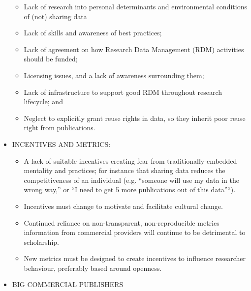 \documentclass[]{article}
\begin{document}
\begin{itemize}
  \begin{itemize}
  \item
    Lack of research into personal determinants and environmental
    conditions of (not) sharing data
  \item
    Lack of skills and awareness of best practices;
  \item
    Lack of agreement on how Research Data Management (RDM) activities
    should be funded;
  \item
    Licensing issues, and a lack of awareness surrounding them;
  \item
    Lack of infrastructure to support good RDM throughout research
    lifecycle; and
  \item
    Neglect to explicitly grant reuse rights in data, so they inherit
    poor reuse right from publications.
  \end{itemize}
\item
  INCENTIVES AND METRICS:

  \begin{itemize}
  \item
    A lack of suitable incentives creating fear from
    traditionally-embedded mentality and practices; for instance that
    sharing data reduces the competitiveness of an individual (e.g.
    ``someone will use my data in the wrong way,'' or ``I need to get 5
    more publications out of this data''``).
  \item
    Incentives must change to motivate and facilitate cultural change.
  \item
    Continued reliance on non-transparent, non-reproducible metrics
    information from commercial providers will continue to be
    detrimental to scholarship.
  \item
    New metrics must be designed to create incentives to influence
    researcher behaviour, preferably based around openness.
  \end{itemize}
\item
  BIG COMMERCIAL PUBLISHERS


\end{itemize}
\end{document}
